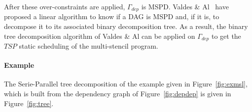 After these over-constraints are applied, $\Gamma_{dep}$ is MSPD. Valdes \& Al~\cite{Valdes:1979:RSP:800135.804393} have proposed a linear algorithm to know if a DAG is MSPD and, if it is, to decompose it to its associated binary decomposition tree. As a result, the binary tree decomposition algorithm of Valdes \& Al can be applied on $\Gamma_{dep}$ to get the $TSP$ static scheduling of the multi-stencil program.

\paragraph{\textbf{Example}} The Serie-Parallel tree decomposition of the example given in Figure~\ref{fig:exmsl}, which is built from the dependency graph of Figure~\ref{fig:depdep} is given in Figure~\ref{fig:tree}.

